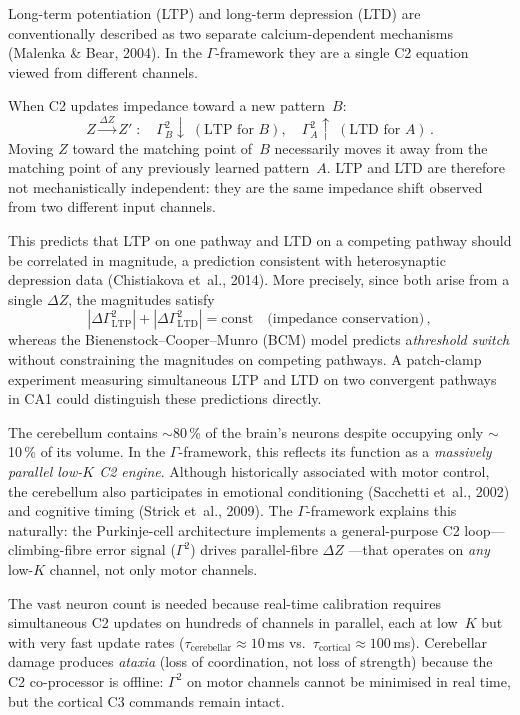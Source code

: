 \documentclass[aps,pre,twocolumn,superscriptaddress,floatfix]{revtex4-2}
\begin{document}
\begin{remark}
\label{rem:ltp-ltd}
Long-term potentiation (LTP) and long-term depression
(LTD) are conventionally described as two separate
calcium-dependent mechanisms (Malenka \& Bear, 2004).
In the $\Gamma$-framework they are a single C2 equation
viewed from different channels.

When C2 updates impedance toward a new pattern~$B$:
\[
  Z \xrightarrow{\Delta Z} Z'
  \;:\quad
  \Gamma^2_B \downarrow \;(\text{LTP for }B),
  \quad
  \Gamma^2_A \uparrow \;(\text{LTD for }A)\,.
\]
Moving $Z$ toward the matching point of~$B$
necessarily moves it away from the matching point
of any previously learned pattern~$A$.
LTP and LTD are therefore not mechanistically
independent: they are the same impedance shift observed
from two different input channels.

This predicts that LTP on one pathway and LTD on a
competing pathway should be correlated in magnitude,
a prediction consistent with heterosynaptic
depression data (Chistiakova et~al., 2014).
More precisely, since both arise from a single
$\Delta Z$, the magnitudes satisfy
\[
  |\Delta\Gamma^2_{\text{LTP}}|
  + |\Delta\Gamma^2_{\text{LTD}}|
  = \text{const}
  \quad\text{(impedance conservation)}\,,
\]
whereas the Bienenstock--Cooper--Munro (BCM) model
predicts a\emph{threshold switch} without
constraining the magnitudes on competing pathways.
A patch-clamp experiment measuring simultaneous
LTP and LTD on two convergent pathways in CA1
could distinguish these predictions directly.
\end{remark}

\begin{remark}
\label{rem:cerebellum}
The cerebellum contains $\sim$80\,\% of the brain's
neurons despite occupying only $\sim$10\,\% of its
volume.
In the $\Gamma$-framework, this reflects
its function as a \emph{massively parallel low-$K$
C2 engine}.
Although historically associated with motor control,
the cerebellum also participates in emotional
conditioning (Sacchetti et~al., 2002) and cognitive
timing (Strick et~al., 2009).
The $\Gamma$-framework explains this naturally:
the Purkinje-cell architecture implements a
general-purpose C2 loop---climbing-fibre error
signal ($\Gamma^2$) drives parallel-fibre $\Delta Z$
---that operates on \emph{any} low-$K$ channel,
not only motor channels.

The vast neuron count is needed because real-time
calibration requires simultaneous C2 updates on
hundreds of channels in parallel, each at low~$K$
but with very fast update rates
($\tau_{\text{cerebellar}} \approx 10$\,ms vs.\
$\tau_{\text{cortical}} \approx 100$\,ms).
Cerebellar damage produces \emph{ataxia}
(loss of coordination, not loss of strength)
because the C2 co-processor is offline:
$\Gamma^2$ on motor channels cannot be minimised
in real time, but the cortical C3 commands remain
intact.
\end{remark}
\end{document}
